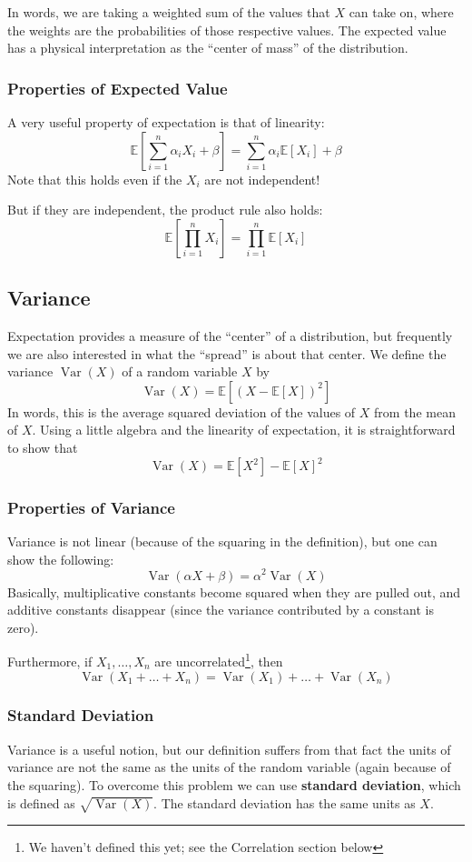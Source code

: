 \documentclass{article}
\newcommand{\ev}[1]{\mathbb{E}[#1]}
\newcommand{\var}[1]{\operatorname{Var}(#1)}
\newcommand{\bigev}[1]{\mathbb{E}\left[#1\right]}
\newcommand{\term}[1]{\textbf{#1}}
\begin{document}
In words, we are taking a weighted sum of the values that $X$ can take on, where the weights are the probabilities of those respective values. The expected value has a physical interpretation as the ``center of mass'' of the distribution.

\subsubsection{Properties of Expected Value}
A very useful property of expectation is that of linearity:
\[\bigev{\sum_{i=1}^n \alpha_i X_i + \beta} = \sum_{i=1}^n \alpha_i \ev{X_i} + \beta\]
Note that this holds even if the $X_i$ are not independent!

But if they are independent, the product rule also holds:
\[\bigev{\prod_{i=1}^n X_i} = \prod_{i=1}^n \ev{X_i}\]

\subsection{Variance}
Expectation provides a measure of the ``center'' of a distribution, but frequently we are also interested in what the ``spread'' is about that center. We define the variance $\var{X}$ of a random variable $X$ by
\[\var{X} = \bigev{\left(X - \ev{X}\right)^2}\]
In words, this is the average squared deviation of the values of $X$ from the mean of $X$. Using a little algebra and the linearity of expectation, it is straightforward to show that
\[\var{X} = \ev{X^2} - \ev{X}^2\]

\subsubsection{Properties of Variance}
Variance is not linear (because of the squaring in the definition), but one can show the following:
\[\var{\alpha X + \beta} = \alpha^2 \var{X}\]
Basically, multiplicative constants become squared when they are pulled out, and additive constants disappear (since the variance contributed by a constant is zero).

Furthermore, if $X_1, \dots, X_n$ are uncorrelated\footnote{We haven't defined this yet; see the Correlation section below}, then
\[\var{X_1 + \dots + X_n} = \var{X_1} + \dots + \var{X_n}\]

\subsubsection{Standard Deviation}
Variance is a useful notion, but our definition suffers from that fact the units of variance are not the same as the units of the random variable (again because of the squaring). To overcome this problem we can use \term{standard deviation}, which is defined as $\sqrt{\var{X}}$. The standard deviation has the same units as $X$.
\end{document}
